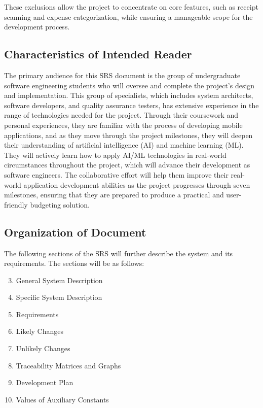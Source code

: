 \documentclass[12pt]{article}
\begin{document}
\noindent These exclusions allow the project to concentrate on core features, such as receipt scanning and expense categorization, while ensuring a manageable scope for the development process.

\subsection{Characteristics of Intended Reader} \label{sec_IntendedReader}
The primary audience for this SRS document is the group of undergraduate
software engineering students who will oversee and complete the project’s design
and implementation. This group of specialists, which includes system architects,
software developers, and quality assurance testers, has extensive experience in
the range of technologies needed for the project. Through their coursework and
personal experiences, they are familiar with the process of developing mobile
applications, and as they move through the project milestones, they will deepen
their understanding of artificial intelligence (AI) and machine learning (ML).
They will actively learn how to apply AI/ML technologies in real-world
circumstances throughout the project, which will advance their development as
software engineers. The collaborative effort will help them improve their
real-world application development abilities as the project progresses through
seven milestones, ensuring that they are prepared to produce a practical and
user-friendly budgeting solution.
\subsection{Organization of Document}

The following sections of the SRS will further describe the system and its requirements. The sections will be as follows:

\begin{enumerate}
	\setcounter{enumi}{2}
	\item General System Description
	\item Specific System Description
	\item Requirements
	\item Likely Changes
	\item Unlikely Changes
	\item Traceability Matrices and Graphs
	\item Development Plan
	\item Values of Auxiliary Constants
\end{enumerate}
\end{document}

